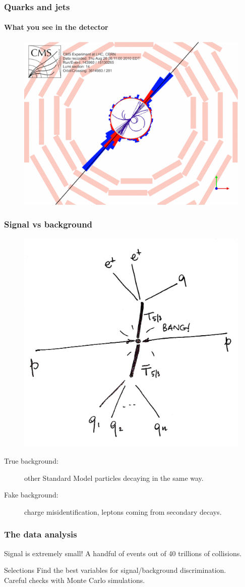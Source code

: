 \documentclass[ukenglish]{beamer}
\begin{document}
\begin{frame}
    \frametitle{Quarks and jets}
    \framesubtitle{What you see in the detector}
    \begin{figure}[h]
        \centering
            \includegraphics[width=.6\textwidth]{dijet}
    \end{figure}
\end{frame}

\begin{frame}
    \frametitle{Signal vs background}
    \begin{figure}[h]
        \centering
            \includegraphics[width=.4\textwidth]{toppartner_decay}
    \end{figure}
    \begin{description}
        \item[True background:] other Standard Model particles decaying in
            the same way.
        \item[Fake background:] charge misidentification, leptons coming
            from secondary decays.
    \end{description}
\end{frame}

\begin{frame}
    \frametitle{The data analysis}
    Signal is extremely small! A handful of events out 
    of 40 trillions of collisions.
    \begin{block}
        {Selections}
        Find the best variables for signal/background discrimination.\\
        Careful checks with Monte Carlo simulations.
    \end{block}
\end{frame}
\end{document}
